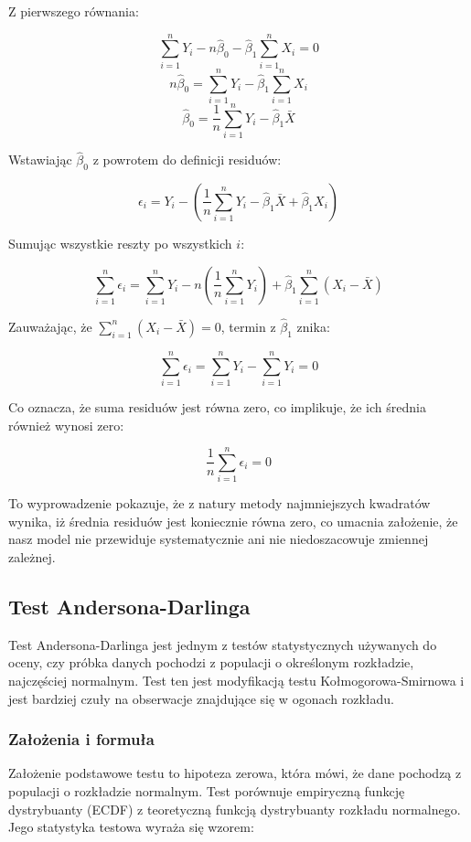 \documentclass{article}
\begin{document}
Z pierwszego równania:

\[ \sum_{i=1}^{n} Y_i - n\hat{\beta}_0 - \hat{\beta}_1\sum_{i=1}^{n}X_i = 0 \]
\[ n\hat{\beta}_0 = \sum_{i=1}^{n} Y_i - \hat{\beta}_1\sum_{i=1}^{n}X_i \]
\[ \hat{\beta}_0 = \frac{1}{n}\sum_{i=1}^{n} Y_i - \hat{\beta}_1\bar{X} \]

Wstawiając \(\hat{\beta}_0\) z powrotem do definicji residuów:

\[ \epsilon_i = Y_i - \left(\frac{1}{n}\sum_{i=1}^{n} Y_i - \hat{\beta}_1\bar{X} + \hat{\beta}_1X_i\right) \]

Sumując wszystkie reszty po wszystkich \(i\):

\[ \sum_{i=1}^{n} \epsilon_i = \sum_{i=1}^{n} Y_i - n\left(\frac{1}{n}\sum_{i=1}^{n} Y_i\right) + \hat{\beta}_1\sum_{i=1}^{n}(X_i - \bar{X}) \]

Zauważając, że \(\sum_{i=1}^{n} (X_i - \bar{X}) = 0\), termin z \(\hat{\beta}_1\) znika:

\[ \sum_{i=1}^{n} \epsilon_i = \sum_{i=1}^{n} Y_i - \sum_{i=1}^{n} Y_i = 0 \]

Co oznacza, że suma residuów jest równa zero, co implikuje, że ich średnia również wynosi zero:

\[ \frac{1}{n}\sum_{i=1}^{n} \epsilon_i = 0 \]

To wyprowadzenie pokazuje, że z natury metody najmniejszych kwadratów wynika, iż średnia residuów jest koniecznie równa zero, co umacnia założenie, że nasz model nie przewiduje systematycznie ani nie niedoszacowuje zmiennej zależnej.

\subsection{Test Andersona-Darlinga}

Test Andersona-Darlinga jest jednym z testów statystycznych używanych do oceny, czy próbka danych pochodzi z populacji o określonym rozkładzie, najczęściej normalnym. Test ten jest modyfikacją testu Kołmogorowa-Smirnowa i jest bardziej czuły na obserwacje znajdujące się w ogonach rozkładu.

\subsubsection{Założenia i formuła}

Założenie podstawowe testu to hipoteza zerowa, która mówi, że dane pochodzą z populacji o rozkładzie normalnym. Test porównuje empiryczną funkcję dystrybuanty (ECDF) z teoretyczną funkcją dystrybuanty rozkładu normalnego. Jego statystyka testowa wyraża się wzorem:
\end{document}

